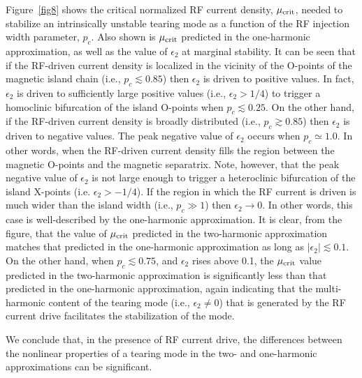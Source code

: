 \documentclass[12pt,prb,aps]{revtex4-1}
\begin{document}
Figure~\ref{fig8} shows the critical normalized RF current density, $\mu_{\rm crit}$, needed to stabilize an intrinsically
unstable tearing mode as a function of the RF injection width parameter, $p_c$. Also shown is  $\mu_{\rm crit}$ predicted in the one-harmonic approximation, as well as the value of $\epsilon_2$ at marginal stability. It can be seen that
if the RF-driven current density is localized in the vicinity of the O-points of the magnetic island chain (i.e., $p_c\lesssim 0.85$) then $\epsilon_2$ is driven to positive values. In fact, $\epsilon_2$ is driven to sufficiently large positive
values (i.e., $\epsilon_2>1/4$) to trigger a homoclinic bifurcation of the  island O-points when  $p_c\lesssim 0.25$. On the other hand, if the RF-driven current density is broadly distributed (i.e., $p_c\gtrsim 0.85$) then $\epsilon_2$ is driven to negative values. The peak negative value of $\epsilon_2$ occurs when $p_c\simeq 1.0$. In other words,
when the RF-driven current density fills the region between the magnetic O-points and the magnetic separatrix. Note, however, that the peak negative value of $\epsilon_2$ is not large enough to trigger a heteroclinic bifurcation of the
island X-points (i.e. $\epsilon_2> -1/4$). If the region in which the RF current is driven is much wider than the
island width (i.e., $p_c\gg 1$) then $\epsilon_2\rightarrow 0$. In other words, this case is well-described by the one-harmonic approximation. It is clear, from the figure, that the value of $\mu_{\rm crit}$ predicted  in the two-harmonic approximation matches that predicted in the one-harmonic approximation as long as $|\epsilon_2|\lesssim 0.1$. On the other hand, when $p_c\lesssim 0.75$, and $\epsilon_2$ rises above 0.1, the $\mu_{\rm crit}$ value predicted  in the 
two-harmonic approximation is significantly less than that predicted  in the one-harmonic approximation, again indicating that the multi-harmonic content of the tearing mode (i.e., $\epsilon_2\neq 0$) that is
generated by the RF current drive facilitates the stabilization of the mode. 

We conclude that, in the presence of RF current drive, the differences between the nonlinear properties
of a tearing mode in the two- and one-harmonic approximations can be significant.  
 
\end{document}
